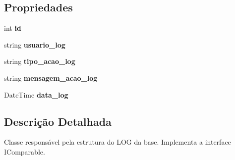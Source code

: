 \subsection*{Propriedades}
\begin{DoxyCompactItemize}
\item 
\hypertarget{class_sistema_r_h_1_1_log_a7b87a0b24d7c5fe16c8e5b4dc74f290c}{
int {\bfseries id}}
\label{class_sistema_r_h_1_1_log_a7b87a0b24d7c5fe16c8e5b4dc74f290c}

\item 
\hypertarget{class_sistema_r_h_1_1_log_a87219201d0a6a602d59965e626f36e4d}{
string {\bfseries usuario\_\-log}}
\label{class_sistema_r_h_1_1_log_a87219201d0a6a602d59965e626f36e4d}

\item 
\hypertarget{class_sistema_r_h_1_1_log_a7f8527ef16fa5e8ed6431c776785cb7c}{
string {\bfseries tipo\_\-acao\_\-log}}
\label{class_sistema_r_h_1_1_log_a7f8527ef16fa5e8ed6431c776785cb7c}

\item 
\hypertarget{class_sistema_r_h_1_1_log_a1065efcd7795fc0c055039edb6a93433}{
string {\bfseries mensagem\_\-acao\_\-log}}
\label{class_sistema_r_h_1_1_log_a1065efcd7795fc0c055039edb6a93433}

\item 
\hypertarget{class_sistema_r_h_1_1_log_a13fb91cebc627c3e0613fa643462fc34}{
DateTime {\bfseries data\_\-log}}
\label{class_sistema_r_h_1_1_log_a13fb91cebc627c3e0613fa643462fc34}

\end{DoxyCompactItemize}


\subsection{Descrição Detalhada}
Classe responsável pela estrutura do LOG da base. Implementa a interface IComparable. 

